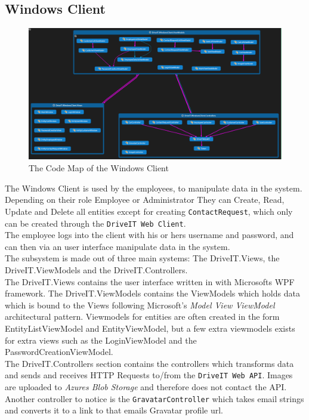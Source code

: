 \subsection{Windows Client} 
\begin{figure}[H]
	\centering
	\includegraphics[scale=0.35]{Figures/WindowsClientCodeMap}
	\caption{The Code Map of the Windows Client}
	\label{fig:WindowsClientCodeMap}
\end{figure}
The Windows Client is used by the employees, to manipulate data in the system. Depending on their role Employee or Administrator They can Create, Read, Update and Delete all entities except for creating \texttt{ContactRequest}, which only can be created through the \texttt{DriveIT Web Client}.\\
The employee logs into the client with his or hers username and password, and can then via an user interface manipulate data in the system.\\
The subsystem is made out of three main systems: The DriveIT.Views, the DriveIT.ViewModels and the DriveIT.Controllers.\\
The DriveIT.Views contains the user interface written in with Microsofts WPF framework. The DriveIT.ViewModels contains the ViewModels which holds data which is bound to the Views following Microsoft's \emph{Model View ViewModel} architectural pattern. Viewmodels for entities are often created in the form EntityListViewModel and EntityViewModel, but a few extra viewmodels exists for extra views such as the LoginViewModel and the PasswordCreationViewModel.\\
The DriveIT.Controllers section contains the controllers which transforms data and sends and receives HTTP Requests to/from the \texttt{DriveIT Web API}. Images are uploaded to \emph{Azures Blob Storage} and therefore does not contact the API. Another controller to notice is the \texttt{GravatarController} which takes email strings and converts it to a link to that emails Gravatar profile url.

